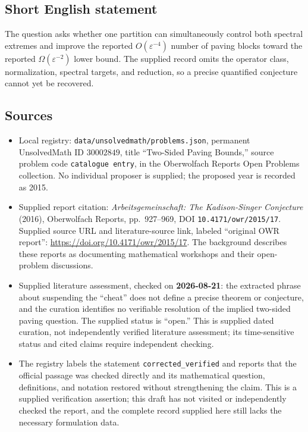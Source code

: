 \documentclass[11pt]{article}
\begin{document}
\subsection{Short English statement}
The question asks whether one partition can simultaneously control both spectral extremes and improve the reported \(O(\varepsilon^{-4})\) number of paving blocks toward the reported \(\Omega(\varepsilon^{-2})\) lower bound. The supplied record omits the operator class, normalization, spectral targets, and reduction, so a precise quantified conjecture cannot yet be recovered.
\subsection{Sources}
\begin{itemize}
\item Local registry: \texttt{data/unsolvedmath/problems.json}, permanent UnsolvedMath ID \(30002849\), title ``Two-Sided Paving Bounds,'' source problem code \texttt{catalogue entry}, in the Oberwolfach Reports Open Problems collection. No individual proposer is supplied; the proposed year is recorded as 2015.
\item Supplied report citation: \emph{Arbeitsgemeinschaft: The Kadison-Singer Conjecture} (2016), Oberwolfach Reports, pp.~927--969, DOI \texttt{10.4171/owr/2015/17}. Supplied source URL and literature-source link, labeled ``original OWR report'': \url{https://doi.org/10.4171/owr/2015/17}. The background describes these reports as documenting mathematical workshops and their open-problem discussions.
\item Supplied literature assessment, checked on \textbf{2026-08-21}: the extracted phrase about suspending the ``cheat'' does not define a precise theorem or conjecture, and the curation identifies no verifiable resolution of the implied two-sided paving question. The supplied status is ``open.'' This is supplied dated curation, not independently verified literature assessment; its time-sensitive status and cited claims require independent checking.
\item The registry labels the statement \texttt{corrected\_verified} and reports that the official passage was checked directly and its mathematical question, definitions, and notation restored without strengthening the claim. This is a supplied verification assertion; this draft has not visited or independently checked the report, and the complete record supplied here still lacks the necessary formulation data.
\end{itemize}
\end{document}
